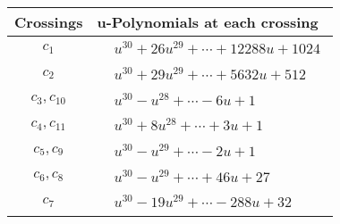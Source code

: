 \documentclass[1p]{elsarticle_modified}
\theoremstyle{definition}
\begin{document}
\begin{tabular}{m{50pt}|m{274pt}}
Crossings & \hspace{64pt}u-Polynomials at each crossing \\
\hline $$\begin{aligned}c_{1}\end{aligned}$$&$\begin{aligned}
&u^{30}+26 u^{29}+\cdots+12288 u+1024
\end{aligned}$\\
\hline $$\begin{aligned}c_{2}\end{aligned}$$&$\begin{aligned}
&u^{30}+29 u^{29}+\cdots+5632 u+512
\end{aligned}$\\
\hline $$\begin{aligned}c_{3},c_{10}\end{aligned}$$&$\begin{aligned}
&u^{30}- u^{28}+\cdots-6 u+1
\end{aligned}$\\
\hline $$\begin{aligned}c_{4},c_{11}\end{aligned}$$&$\begin{aligned}
&u^{30}+8 u^{28}+\cdots+3 u+1
\end{aligned}$\\
\hline $$\begin{aligned}c_{5},c_{9}\end{aligned}$$&$\begin{aligned}
&u^{30}- u^{29}+\cdots-2 u+1
\end{aligned}$\\
\hline $$\begin{aligned}c_{6},c_{8}\end{aligned}$$&$\begin{aligned}
&u^{30}- u^{29}+\cdots+46 u+27
\end{aligned}$\\
\hline $$\begin{aligned}c_{7}\end{aligned}$$&$\begin{aligned}
&u^{30}-19 u^{29}+\cdots-288 u+32
\end{aligned}$\\
\hline
\end{tabular}\\~\\
\newpage\renewcommand{\arraystretch}{1}
\end{document}
